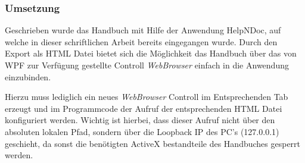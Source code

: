 \subsubsection{Umsetzung}
Geschrieben wurde das Handbuch mit Hilfe der Anwendung HelpNDoc, auf welche in dieser schriftlichen Arbeit bereits eingegangen wurde. Durch den Export als HTML Datei bietet sich die Möglichkeit das Handbuch über das von WPF zur Verfügung gestellte Controll \textit{WebBrowser} einfach in die Anwendung einzubinden. 

Hierzu muss lediglich ein neues \textit{WebBrowser} Controll im Entsprechenden Tab erzeugt und im Programmcode der Aufruf der entsprechenden HTML Datei konfiguriert werden.
Wichtig ist hierbei, dass dieser Aufruf nicht über den absoluten lokalen Pfad, sondern über die Loopback IP des PC's (127.0.0.1) geschieht, da sonst die benötigten ActiveX bestandteile des Handbuches gesperrt werden.